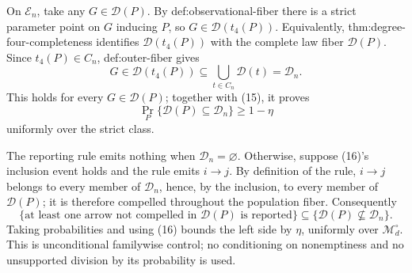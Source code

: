 On \(\mathcal E_n\), take any \(G\in\mathcal D(P)\).  By def:observational-fiber there is a strict parameter point on \(G\) inducing \(P\), so \(G\in\mathcal D(t_4(P))\).  Equivalently, thm:degree-four-completeness identifies \(\mathcal D(t_4(P))\) with the complete law fiber \(\mathcal D(P)\).  Since \(t_4(P)\in C_n\), def:outer-fiber gives
\[
 G\in\mathcal D(t_4(P))
 \subseteq\bigcup_{t\in C_n}\mathcal D(t)=\mathcal D_n.
\]
This holds for every \(G\in\mathcal D(P)\); together with (15), it proves
\[
 \Pr_P\{\mathcal D(P)\subseteq\mathcal D_n\}\ge1-\eta
\tag{16}
\]
uniformly over the strict class.

The reporting rule emits nothing when \(\mathcal D_n=\varnothing\).  Otherwise, suppose (16)'s inclusion event holds and the rule emits \(i\to j\).  By definition of the rule, \(i\to j\) belongs to every member of \(\mathcal D_n\), hence, by the inclusion, to every member of \(\mathcal D(P)\); it is therefore compelled throughout the population fiber.  Consequently
\[
 \{\text{at least one arrow not compelled in }\mathcal D(P)\text{ is reported}\}
 \subseteq
 \{\mathcal D(P)\nsubseteq\mathcal D_n\}.
\]
Taking probabilities and using (16) bounds the left side by \(\eta\), uniformly over \(\mathcal M_d^\circ\).  This is unconditional familywise control; no conditioning on nonemptiness and no unsupported division by its probability is used.
